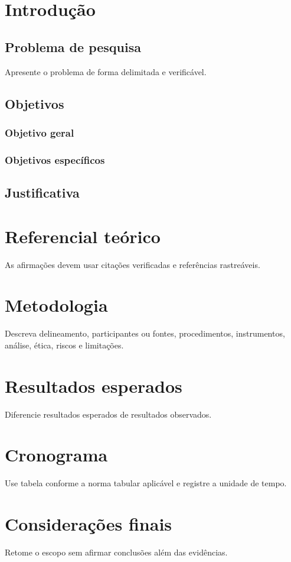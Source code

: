 \documentclass[12pt,openright,oneside,a4paper,brazil]{abntex2}
\begin{document}
\imprimircapa
\imprimirfolhaderosto
{}
\tableofcontents*
\cleardoublepage

\chapter{Introdução}
\section{Problema de pesquisa}
Apresente o problema de forma delimitada e verificável.
\section{Objetivos}
\subsection{Objetivo geral}
\subsection{Objetivos específicos}
\section{Justificativa}

\chapter{Referencial teórico}
As afirmações devem usar citações verificadas e referências rastreáveis.

\chapter{Metodologia}
Descreva delineamento, participantes ou fontes, procedimentos, instrumentos, análise, ética, riscos e limitações.

\chapter{Resultados esperados}
Diferencie resultados esperados de resultados observados.

\chapter{Cronograma}
Use tabela conforme a norma tabular aplicável e registre a unidade de tempo.

\chapter{Considerações finais}
Retome o escopo sem afirmar conclusões além das evidências.

\postextual

\end{document}
